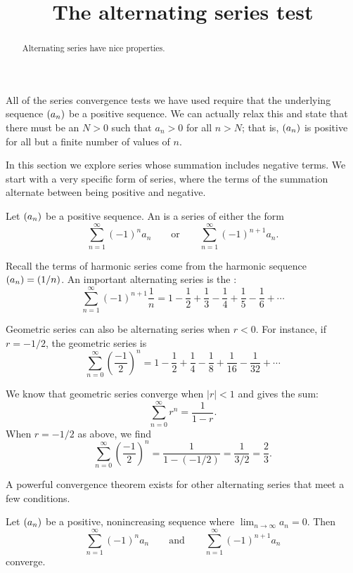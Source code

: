 \documentclass{ximera}
\title[Dig-In:]{The alternating series test}
\begin{document}
\begin{abstract}
  Alternating series have nice properties.
\end{abstract}
\maketitle

All of the series convergence tests we have used require that the
underlying sequence $\left( a_n \right)$ be a positive sequence. We can
actually relax this and state that there must be an $N>0$ such that
$a_n>0$ for all $n>N$; that is, $\left( a_n \right)$ is positive for all but a
finite number of values of $n$.

In this section we explore series whose summation includes negative
terms. We start with a very specific form of series, where the terms
of the summation alternate between being positive and negative.

\begin{definition}
Let $\left( a_n \right)$ be a positive sequence. An  is
a series of either the form 
\[
\sum_{n=1}^\infty (-1)^na_n\qquad \text{or}\qquad \sum_{n=1}^\infty (-1)^{n+1}a_n.
\]
\end{definition}

Recall the terms of harmonic series come from the harmonic sequence
$\left( a_n \right) = \left( 1/n \right)$. An important alternating series is the
:
\[
\sum_{n=1}^\infty (-1)^{n+1}\frac1n = 1-\frac12+\frac13-\frac14+\frac15-\frac16+\cdots
\]

Geometric series can also be alternating series when $r<0$. For
instance, if $r=-1/2$, the geometric series is
\[
\sum_{n=0}^\infty \left(\frac{-1}{2}\right)^n = 1-\frac12+\frac14-\frac18+\frac1{16}-\frac1{32}+\cdots
\]

We know that geometric series converge when $|r|<1$ and gives the sum:
\[
\sum_{n=0}^\infty r^n = \frac1{1-r}.
\]
When $r=-1/2$ as above, we find
\[
\sum_{n=0}^\infty \left(\frac{-1}{2}\right)^n = \frac1{1-(-1/2)} = \frac 1{3/2} = \frac23.
\]

A powerful convergence theorem exists for other alternating series
that meet a few conditions.

\begin{theorem}
Let $\left( a_n \right)$ be a positive, nonincreasing sequence where
$\lim_{n\to\infty}a_n=0$. Then
\[
\sum_{n=1}^\infty (-1)^{n}a_n \qquad \text{and}\qquad \sum_{n=1}^\infty (-1)^{n+1}a_n 
\]
converge.
\end{theorem}
\end{document}
